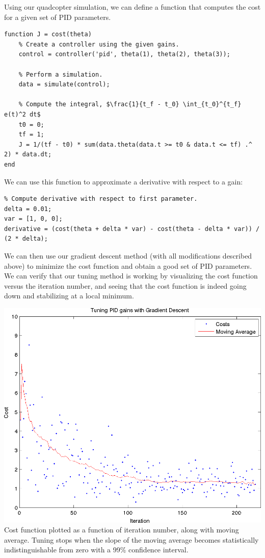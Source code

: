 \documentclass{article}
\begin{document}
Using our quadcopter simulation, we can define a function that computes the cost for a given set of
PID parameters.
\begin{verbatim}
function J = cost(theta)
    % Create a controller using the given gains.
    control = controller('pid', theta(1), theta(2), theta(3));

    % Perform a simulation.
    data = simulate(control);

    % Compute the integral, $\frac{1}{t_f - t_0} \int_{t_0}^{t_f} e(t)^2 dt$
    t0 = 0;
    tf = 1;
    J = 1/(tf - t0) * sum(data.theta(data.t >= t0 & data.t <= tf) .^ 2) * data.dt;
end
\end{verbatim}
We can use this function to approximate a derivative with respect to a gain:
\begin{verbatim}
% Compute derivative with respect to first parameter.
delta = 0.01;
var = [1, 0, 0];
derivative = (cost(theta + delta * var) - cost(theta - delta * var)) / (2 * delta);
\end{verbatim}
We can then use our gradient descent method (with all modifications described above) to minimize the
cost function and obtain a good set of PID parameters. We can verify that our tuning method is
working by visualizing the cost function versus the iteration number, and seeing that the cost
function is indeed going down and stabilizing at a local minimum.
\begin{center}
    \includegraphics[scale=0.60]{images/training.png} \\
    {
        Cost function plotted as a function of iteration number, along with moving average. 
        Tuning stops when the slope of the moving average becomes statistically indistinguishable
        from zero with a 99\% confidence interval.
    }
\end{center}
\end{document}
